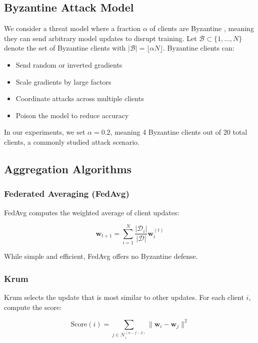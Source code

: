 \documentclass[12pt,a4paper,onecolumn]{article}
\begin{document}
\subsection{Byzantine Attack Model}

We consider a threat model where a fraction $\alpha$ of clients are Byzantine \cite{lamport1982byzantine}, meaning they can send arbitrary model updates to disrupt training. Let $\mathcal{B} \subset \{1, \ldots, N\}$ denote the set of Byzantine clients with $|\mathcal{B}| = \lfloor \alpha N \rfloor$. Byzantine clients can:

\begin{itemize}
    \item Send random or inverted gradients
    \item Scale gradients by large factors
    \item Coordinate attacks across multiple clients
    \item Poison the model to reduce accuracy
\end{itemize}

In our experiments, we set $\alpha = 0.2$, meaning 4 Byzantine clients out of 20 total clients, a commonly studied attack scenario.

\subsection{Aggregation Algorithms}

\subsubsection{Federated Averaging (FedAvg)}

FedAvg computes the weighted average of client updates:

\begin{equation}
\mathbf{w}_{t+1} = \sum_{i=1}^{N} \frac{|\mathcal{D}_i|}{|\mathcal{D}|} \mathbf{w}_i^{(t)}
\label{eq:fedavg}
\end{equation}

While simple and efficient, FedAvg offers no Byzantine defense.

\subsubsection{Krum}

Krum selects the update that is most similar to other updates. For each client $i$, compute the score:

\begin{equation}
\text{Score}(i) = \sum_{j \in \mathcal{N}_i^{(n-f-2)}} \|\mathbf{w}_i - \mathbf{w}_j\|^2
\label{eq:krum_score}
\end{equation}
\end{document}
